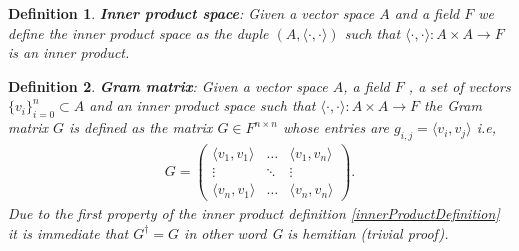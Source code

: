 \documentclass[12pt,letterpaper]{article}
\newtheorem{definition}{Definition}
\begin{document}
\begin{multicols}{2}
\begin{definition}
\textbf{Inner product space}: Given a vector space $A$ and a field $F$ we define the  inner product space as the duple $(A,\langle \cdot , \cdot \rangle)$ such that  $\langle \cdot , \cdot \rangle:A\times A\rightarrow F$ is an inner product.
\end{definition}

\begin{definition}
\textbf{Gram matrix}: Given a vector space $A$, a field $F$ , a set of vectors $\{v_i\}_{i=0}^n\subset A$ and an inner product space such that  $\langle \cdot , \cdot \rangle:A\times A\rightarrow F$  the Gram matrix $G$ is defined as the matrix $G\in F^{n\times n}$ whose entries are $g_{i,j}=\langle v_i,v_j\rangle$ i.e,
\begin{align}
G=\begin{pmatrix}
\langle v_1,v_1\rangle & \hdots & \langle v_1,v_n\rangle\\
\vdots & \ddots & \vdots\\
\langle v_n,v_1\rangle & \hdots & \langle v_n,v_n\rangle
\end{pmatrix}.
\end{align}
Due to the first property of the inner product definition \ref{innerProductDefinition} it is immediate that $G^\dagger =G$ in other word G is hemitian (trivial proof).
\end{definition}

\end{multicols}
\newpage



 
\end{document}
